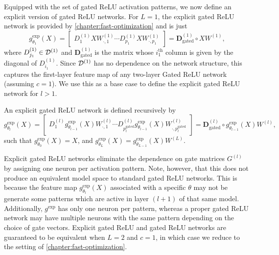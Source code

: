 Equipped with the set of gated ReLU activation patterns, we
now define an explicit version of gated ReLU networks.
For \( L = 1 \), the explicit gated ReLU network is provided by
\cref{chapter:fast-optimization} and is just
\begin{equation}\label{eq:explicit-gated-relu}
    g^{\text{exp}}_{\theta_{1}}(X)
    = \begin{bmatrix}
        D^{(1)}_{1} X W^{(1)}_{\cdot, 1} \cdots
        D^{(1)}_{p_1} X W^{(1)}_{\cdot, p_1}
    \end{bmatrix}
    = \mathbf{D}^{(1)}_{\text{gated}} \circ X W^{(1)},
\end{equation}
where \( D^{(1)}_{j_1} \in \mathcal{D}^{(1)} \) and
\( \mathbf{D}^{(1)}_{\text{gated}}\) is the matrix whose \( i_1^{\text{th}} \)
column is given by the diagonal of \( D^{(1)}_{i_1} \).
Since \( \mathcal{D}^{(1)} \) has no dependence on the network structure, this
captures the first-layer feature map of any two-layer Gated ReLU network
(assuming \( c=1 \)).
We use this as a base case to define the explicit gated ReLU network for
\( l > 1 \).
\begin{definition}\label{def:explicit-gated-relu}
    An explicit gated ReLU network is defined recursively by
    \begin{equation}
        g^{\text{exp}}_{\theta_{l}}(X)
        = \begin{bmatrix}
            D^{(l)}_{1} g^{\text{exp}}_{\theta_{l-1}}(X) W^{(l)}_{\cdot, 1}  \cdots
            D^{(l)}_{p_l^{\text{gated}}} g^{\text{exp}}_{\theta_{l-1}}(X) W^{(l)}_{\cdot, p_l^{\text{gated}}}
        \end{bmatrix}
        = \mathbf{D}_{\text{gated}}^{(l)} \circ g^{\text{exp}}_{\theta_{l-1}}(X) W^{(l)},
    \end{equation}
    such that \( g_{\theta_0}^{\text{exp}}(X) = X \), and
    \( g_{\theta_L}^{\text{exp}}(X) = g^{\text{exp}}_{\theta_{L-1}}(X) W^{(L)} \).
\end{definition}

Explicit gated ReLU networks eliminate the dependence on gate
matrices \( G^{(l)} \) by assigning one neuron per activation pattern.
Note, however, that this does not produce an equivalent model space to standard
gated ReLU networks.
This is because the feature map \( g^{\text{exp}}_{\theta_{l}}(X) \) associated
with a specific \( \theta \) may not be generate some patterns which are active
in layer \( (l+1) \) of that same model.
Additionally, \( g^{\text{exp}} \) has only one neuron per pattern,
whereas a proper gated ReLU network may have multiple neurons with the same
pattern depending on the choice of gate vectors.
Explicit gated ReLU and gated ReLU networks are guaranteed to be equivalent
when \( L = 2 \) and \( c = 1 \), in which case we reduce to the setting
of \cref{chapter:fast-optimization}.

